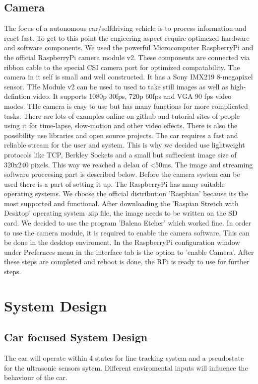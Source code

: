\documentclass[conference]{IEEEtran}
\begin{document}
\subsection{Camera}
The focus of a autonomous car/selfdriving vehicle is to process information and react fast. To get to this point the engieering aspect require optimezed hardware and software components. We used the powerful Microcomputer RaspberryPi and the official RaspberryPi camera module v2. These components are connected via ribbon cable to the special CSI camera port for optimized compatability. The camera in it self is small and well constructed. It has a Sony IMX219 8-megapixel sensor. THe Module v2 can be used to used to take still images as well as high-defintion video. It supports  1080p 30fps, 720p 60fps and VGA 90 fps video modes. THe camera is easy to use but has many functions for more complicated tasks. There are lots of examples online on github and tutorial sites of people using it for time-lapse, slow-motion and other video effects. There is also the possibility use libraries and open source projects. 
\newline
The car requires a fast and reliable stream for the user and system. This is why we decided use lightweight protocols like TCP, Berkley Sockets and a small but suffiecient image size of 320x240 pixels. This way we reached a delau of <50ms. The image and streaming software proccesing part is described below. Before the camera system can be used there is a part of setting it up. The RaspberryPi has many suitable operating systems. We choose the official distribution 'Raspbian' because its the most supported and functional. After downloading the 'Raspian Stretch with Desktop' operating system .zip file, the image needs to be written on the SD card. We decided to use the program 'Balena Etcher' which worked fine. In order to use the camera module, it is required to enable the camera software. This can be done in the desktop enviroment. In the RaspberryPi configuration window under Prefernces menu in the interface tab is the option to 'enable Camera'. After these steps are completed and reboot is done, the RPi is ready to use for further steps.
    

\section{System Design}
\subsection{Car focused System Design}
The car will operate within 4 states for line tracking system and a pseudostate for the ultrasonic sensors sytem. Different enviromental inputs will influence the behaviour of the car.
\end{document}
